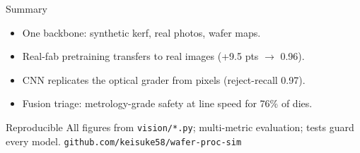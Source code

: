 \documentclass[aspectratio=169,10pt]{beamer}
\begin{document}
\begin{frame}{Summary}
  \begin{itemize}
    \item One backbone: synthetic kerf, real photos, wafer maps.
    \item Real-fab pretraining transfers to real images (+9.5 pts $\to$ 0.96).
    \item CNN replicates the optical grader from pixels (reject-recall 0.97).
    \item Fusion triage: metrology-grade safety at line speed for 76\% of dies.
  \end{itemize}
  \vspace{3mm}
  \begin{block}{Reproducible}
    All figures from \texttt{vision/*.py}; multi-metric evaluation; tests guard
    every model. \texttt{github.com/keisuke58/wafer-proc-sim}
  \end{block}
\end{frame}
\end{document}
